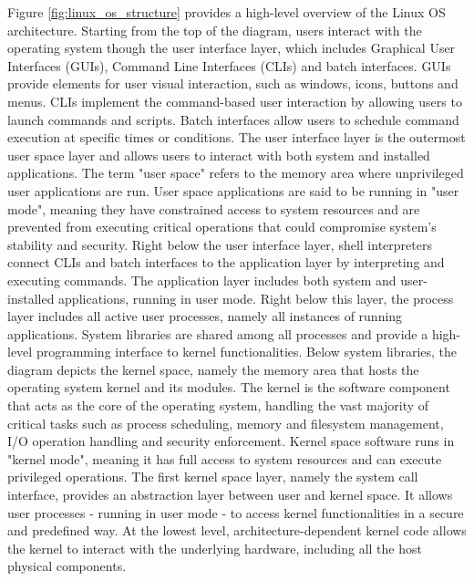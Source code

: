 Figure \ref{fig:linux_os_structure} provides a high-level overview of the Linux OS architecture.
Starting from the top of the diagram, users interact with the operating system though the user interface layer, which includes Graphical User Interfaces (GUIs), Command Line Interfaces (CLIs) and batch interfaces. GUIs provide elements for user visual interaction, such as windows, icons, buttons and menus. CLIs implement the command-based user interaction by allowing users to launch commands and scripts. Batch interfaces allow users to schedule command execution at specific times or conditions.
The user interface layer is the outermost user space layer and allows users to interact with both system and installed applications.
The term "user space" refers to the memory area where unprivileged user applications are run. 
User space applications are said to be running in "user mode", meaning they have constrained access to system resources and are prevented from executing critical operations that could compromise system's stability and security. \newline
Right below the user interface layer, shell interpreters connect CLIs and batch interfaces to the application layer by interpreting and executing commands.
The application layer includes both system and user-installed applications, running in user mode. Right below this layer, the process layer includes all active user processes, namely all instances of running applications. System libraries are shared among all processes and provide a high-level programming interface to kernel functionalities. 
Below system libraries, the diagram depicts the kernel space, namely the memory area that hosts the operating system kernel and its modules. 
The kernel is the software component that acts as the core of the operating system, handling the vast majority of critical tasks such as process scheduling, memory and filesystem management, I/O operation handling and security enforcement.
Kernel space software runs in "kernel mode", meaning it has full access to system resources and can execute privileged operations.
The first kernel space layer, namely the system call interface, provides an abstraction layer between user and kernel space. It allows user processes - running in user mode - to access kernel functionalities in a secure and predefined way.
At the lowest level, architecture-dependent kernel code allows the kernel to interact with the underlying hardware, including all the host physical components.

